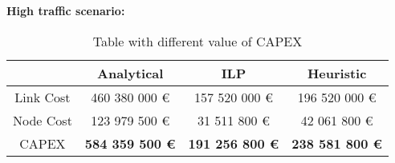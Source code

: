 \vspace{11pt}
\textbf{High traffic scenario:}\\

\begin{table}[h!]
\centering
\begin{tabular}{| c | c | c | c |}
 \hline
   & Analytical & ILP & Heuristic \\
 \hline\hline
 Link Cost & 460 380 000 \euro & 157 520 000 \euro & 196 520 000 \euro \\
 Node Cost & 123 979 500 \euro & 31 511 800 \euro & 42 061 800 \euro \\
 CAPEX & \textbf{584 359 500 \euro} & \textbf{191 256 800 \euro} & \textbf{238 581 800 \euro} \\
 \hline
\end{tabular}
\caption{Table with different value of CAPEX }
\label{table_comparative_transp_sur_ref_3}
\end{table}

